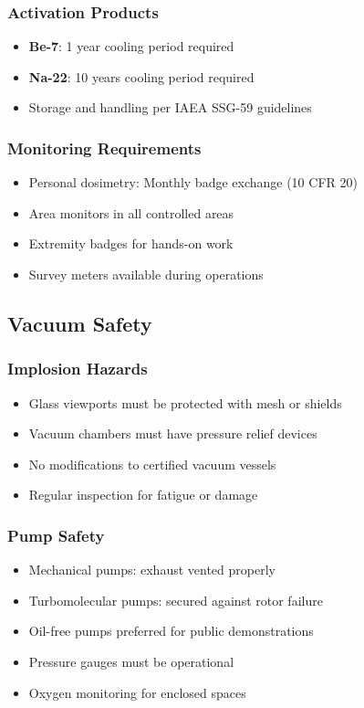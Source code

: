 \subsubsection{Activation Products}
\begin{itemize}[noitemsep]
    \item \textbf{Be-7}: 1 year cooling period required
    \item \textbf{Na-22}: 10 years cooling period required
    \item Storage and handling per IAEA SSG-59 guidelines
\end{itemize}

\subsubsection{Monitoring Requirements}
\begin{itemize}[noitemsep]
    \item Personal dosimetry: Monthly badge exchange (10 CFR 20)
    \item Area monitors in all controlled areas
    \item Extremity badges for hands-on work
    \item Survey meters available during operations
\end{itemize}

\subsection{Vacuum Safety}

\subsubsection{Implosion Hazards}
\begin{itemize}[noitemsep]
    \item Glass viewports must be protected with mesh or shields
    \item Vacuum chambers must have pressure relief devices
    \item No modifications to certified vacuum vessels
    \item Regular inspection for fatigue or damage
\end{itemize}

\subsubsection{Pump Safety}
\begin{itemize}[noitemsep]
    \item Mechanical pumps: exhaust vented properly
    \item Turbomolecular pumps: secured against rotor failure
    \item Oil-free pumps preferred for public demonstrations
    \item Pressure gauges must be operational
    \item Oxygen monitoring for enclosed spaces
\end{itemize}


